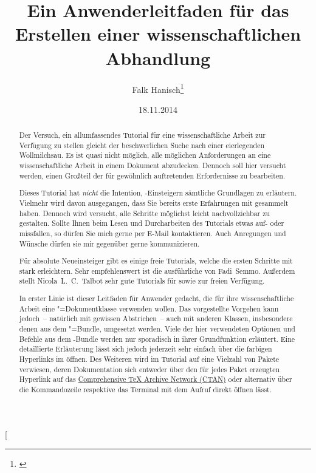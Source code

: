\documentclass[%
  english,ngerman,%
  geometry=no,DIV=12,automark,%
]{tudscrartcl}
\begin{document}
\title{%
  Ein Anwenderleitfaden für das Erstellen einer wissenschaftlichen Abhandlung%
}
\author{Falk Hanisch\thanks{\noexpand\href{mailto:\tudscrmail}{\tudscrmail}}}
\date{18.11.2014}
\makeatletter
\begingroup%
  \def\and{, }%
  \let\thanks\@gobble%
  \let\footnote\@gobble%
\endgroup%
\makeatother
\StartTutorial[%
  \begin{abstract}\noindent
  Der Versuch, ein allumfassendes Tutorial für eine wissenschaftliche Arbeit 
  zur Verfügung zu stellen gleicht der beschwerlichen Suche nach einer 
  eierlegenden Wollmilchsau. Es ist quasi nicht möglich, alle möglichen 
  Anforderungen an eine wissenschaftliche Arbeit in einem Dokument abzudecken. 
  Dennoch soll hier versucht werden, einen Großteil der für gewöhnlich 
  auftretenden Erfordernisse zu bearbeiten.
  
  Dieses Tutorial hat \emph{nicht} die Intention, -Einsteigern 
  sämtliche Grundlagen zu erläutern. Vielmehr wird davon ausgegangen, dass Sie 
  bereits erste Erfahrungen mit  gesammelt haben. Dennoch wird 
  versucht, alle Schritte möglichst leicht nachvollziehbar zu gestalten. Sollte 
  Ihnen beim Lesen und Durcharbeiten des Tutorials etwas auf- oder missfallen, 
  so dürfen Sie mich gerne per E-Mail kontaktieren. Auch Anregungen und Wünsche 
  dürfen sie mir gegenüber gerne kommunizieren.
  
  Für absolute Neueinsteiger gibt es einige freie Tutorials, welche die ersten 
  Schritte mit  stark erleichtern. Sehr empfehlenswert ist die 
  ausführliche  
  von Fadi~Semmo. Außerdem stellt Nicola~L.~C.~Talbot sehr gute Tutorials für 
  sowie  zur 
  freien Verfügung.
  
  In erster Linie ist dieser Leitfaden für Anwender gedacht, die für ihre
  wissenschaftliche Arbeit eine \TUDScript"=Dokumentklasse verwenden wollen. 
  Das vorgestellte Vorgehen kann jedoch~-- natürlich mit gewissen Abstrichen~-- 
  auch mit anderen Klassen, insbesondere denen aus dem \KOMAScript"=Bundle, 
  umgesetzt werden. Viele der hier verwendeten Optionen und Befehle aus dem 
  \TUDScript-Bundle werden nur sporadisch in ihrer Grundfunktion erläutert. 
  Eine detaillierte Erläuterung lässt sich jedoch jederzeit sehr einfach über 
  die farbigen Hyperlinks im  öffnen.
  Des Weiteren wird im Tutorial auf eine Vielzahl von Pakete verwiesen, deren 
  Dokumentation sich entweder über den für jedes Paket erzeugten Hyperlink auf 
  das \href{http://www.ctan.org/}{Comprehensive TeX Archive Network (CTAN)} 
  oder alternativ über die Kommandozeile respektive das Terminal mit dem Aufruf 
   direkt öffnen lässt.
  

\end{abstract}
\end{document}
